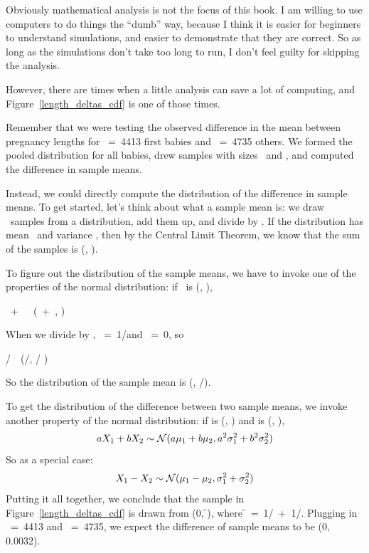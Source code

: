 \documentclass[12pt]{book}
\begin{document}
Obviously mathematical analysis is not the focus of this book.  I am
willing to use computers to do things the ``dumb'' way, because I
think it is easier for beginners to understand simulations, and easier
to demonstrate that they are correct.  So as long as the simulations
don't take too long to run, I don't feel guilty for skipping the
analysis.

However, there are times when a little analysis can save a lot of
computing, and Figure~\ref{length_deltas_cdf} is one of those times.

Remember that we were testing the observed difference in the mean between
pregnancy lengths for \n~=~4413 first babies and \m~=~4735 others.  We formed
the pooled distribution for all babies, drew samples with sizes \n~and
\m, and computed the difference in sample means.

Instead, we could directly compute the distribution of the difference
in sample means.  To get started, let's think about what a sample mean
is: we draw \n~samples from a distribution, add them up, and
divide by \n.  If the distribution has mean \mymu~and variance
\sigmasq, then by the Central Limit Theorem, we know that the sum of
the samples is \mynormal (\n \mymu, \n \sigmasq).

To figure out the distribution of the sample means, we have to invoke
one of the properties of the normal distribution: if \X~is
\mynormal (\mymu, \sigmasq),

\quad \mya\X~+~\myb~\mysim~\mynormal(\mya \mymu~+~\myb, \mya{} \sigmasq)

When we divide by \n, \mya~=~1/\n and \myb~=~0, so

\X/\n~\mysim~\mynormal(\mymu /\n, \sigmasq/ \n{})

So the distribution of the sample mean is \mynormal (\mymu, \sigmasq/\n).

To get the distribution of the difference between two sample means,
we invoke another property of the normal distribution: if \X{} is
\mynormal (\mymu{}, \mysigma{}) and \X{} is
\mynormal (\mymu{}, \mysigma{}),
%
\[ aX_1 + bX_2 \sim \mathcal{N} (a\mu_1 + b\mu_2, 
                                 a^2\sigma_1^2 + b^2\sigma_2^2) \]
%
So as a special case:
%
\[ X_1 - X_2 \sim \mathcal{N} (\mu_1 - \mu_2, 
                               \sigma_1^2 + \sigma_2^2) \]
%
Putting it all together, we conclude that the sample in
Figure~\ref{length_deltas_cdf} is drawn from 
\mynormal (0, \f \sigmasq), where \f~=~1/\n~+~1/\m.  Plugging in
\n~=~4413 and \m~=~4735, we expect the difference of sample means to be
\mynormal (0, 0.0032).
\end{document}
